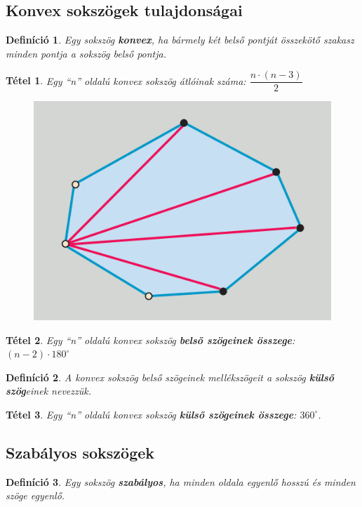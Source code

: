 \documentclass[12pt,a4paper]{article}
\newtheorem{theorem}{Tétel} [section]
\newtheorem{definition}{Definíció} [section]
\begin{document}
\subsection{Konvex sokszögek tulajdonságai}
\begin{definition}
Egy sokszög \textbf{konvex}, ha bármely két belső pontját összekötő szakasz minden pontja a sokszög belső pontja.
\end{definition}
\begin{theorem}
Egy ``n'' oldalú konvex sokszög átlóinak száma: $\dfrac{n\cdot (n-3)}{2}$
\end{theorem}
\begin{figure}[h]
\centering
\includegraphics[scale=0.3]{geometry/sokszog_atlo}
\end{figure}



\begin{theorem}
Egy ``n'' oldalú konvex sokszög \textbf{belső szögeinek összege}: $(n-2)\cdot 180^\circ$
\end{theorem}

\begin{definition}
A konvex sokszög belső szögeinek mellékszögeit a sokszög \textbf{külső szög}einek nevezzük.
\end{definition}

\begin{theorem}
Egy ``n'' oldalú konvex sokszög \textbf{külső szögeinek összege}: $360^\circ$.
\end{theorem}

\subsection{Szabályos sokszögek}
\begin{definition}
Egy sokszög \textbf{szabályos}, ha minden oldala egyenlő hosszú és minden szöge egyenlő.
\end{definition}
\end{document}

